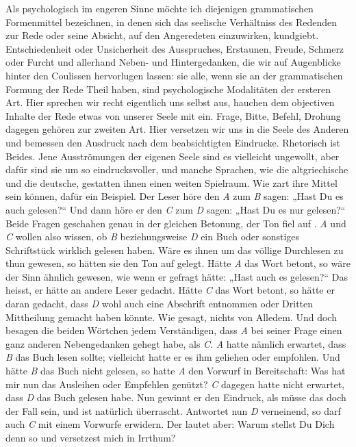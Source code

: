 Als psychologisch im engeren Sinne möchte ich diejenigen grammatischen Formenmittel bezeichnen, in denen sich das seelische Verhältniss des Redenden zur Rede oder seine Absicht, auf den Angeredeten einzuwirken, kundgiebt. Entschiedenheit oder Unsicherheit des Ausspruches, Erstaunen, Freude, Schmerz oder Furcht und allerhand Neben- und Hintergedanken, die wir auf Augenblicke hinter den Coulissen hervorlugen lassen: sie alle, wenn sie an der grammatischen Formung der \label{fp.99} Rede Theil haben, sind psychologische Modalitäten der ersteren Art. Hier sprechen wir recht eigentlich uns selbst aus, hauchen dem objectiven In\label{sp.96}halte der Rede etwas von unserer Seele mit ein. Frage, Bitte, Befehl, Drohung dagegen gehören zur zweiten Art. Hier versetzen wir uns in die Seele des Anderen und bemessen den Ausdruck nach dem beabsichtigten Eindrucke. Rhetorisch ist Beides. Jene Ausströmungen der eigenen Seele sind es vielleicht ungewollt, aber dafür sind sie um so eindrucksvoller, und manche Sprachen, wie die altgriechische und die deutsche, gestatten ihnen einen weiten Spielraum. Wie zart ihre Mittel sein können, dafür ein Beispiel. Der Leser höre den \textit{A} zum \textit{B} sagen: „Hast Du es auch gelesen?“ Und dann höre er den \textit{C} zum \textit{D} sagen: „Hast Du es nur gelesen?“ Beide Fragen geschahen genau in der gleichen Betonung, der Ton fiel auf . \textit{A} und \textit{C} wollen also wissen, ob \textit{B} beziehungsweise \textit{D} ein Buch oder sonstiges Schriftstück wirklich gelesen haben. Wäre es ihnen um das völlige Durchlesen zu thun gewesen, so hätten sie den Ton auf  gelegt. Hätte \textit{A} das Wort  betont, so wäre der Sinn ähnlich gewesen, wie wenn er gefragt hätte: „Hast auch  es gelesen?“ Das heisst, er hätte an andere Leser gedacht. Hätte \textit{C} das Wort  betont, so hätte er daran gedacht, dass \textit{D} wohl auch eine Abschrift entnommen oder Dritten Mittheilung gemacht haben könnte. Wie gesagt, nichts von Alledem. Und doch besagen die beiden Wörtchen jedem Verständigen, dass \textit{A} bei seiner Frage einen ganz anderen Nebengedanken gehegt habe, als \textit{C}. \textit{A} hatte nämlich erwartet, dass \textit{B} das Buch lesen sollte; vielleicht hatte er es ihm geliehen oder empfohlen. Und hätte \textit{B} das Buch nicht gelesen, so hatte \textit{A} den Vorwurf in Bereitschaft: Was hat mir nun das Ausleihen oder Empfehlen genützt? \textit{C} dagegen hatte nicht erwartet, dass \textit{D} das Buch gelesen habe. Nun gewinnt er den Eindruck, als müsse das doch der Fall sein, und ist natürlich überrascht. Antwortet nun \textit{D} verneinend, so darf auch \textit{C} mit einem Vorwurfe erwidern. Der lautet aber: Warum stellst Du Dich denn so und versetzest mich in Irrthum?

